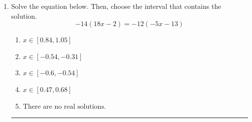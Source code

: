 \documentclass[14pt]{extbook}
\newcommand{\litem}[1]{\item#1\hspace*{-1cm}\rule{\textwidth}{0.4pt}}
\begin{document}
\begin{enumerate}
{\begin{enumerate}[label=\Alph*.]
\end{enumerate} }
\litem{
Solve the equation below. Then, choose the interval that contains the solution.\[ -14(18x -2) = -12(-5x -13) \]\begin{enumerate}[label=\Alph*.]
\item \( x \in [0.84, 1.05] \)
\item \( x \in [-0.54, -0.31] \)
\item \( x \in [-0.6, -0.54] \)
\item \( x \in [0.47, 0.68] \)
\item \( \text{There are no real solutions.} \)

\end{enumerate} }
\end{enumerate}
\end{document}
